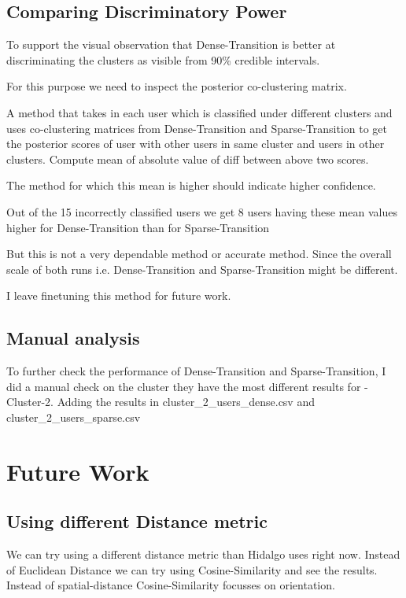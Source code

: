 \documentclass{article}
\begin{document}
\subsection{Comparing Discriminatory Power}
To support the visual observation that Dense-Transition is better at discriminating the clusters as visible from 90\% credible intervals.

For this purpose we need to inspect the posterior co-clustering matrix.

A method that takes in each user which is classified under different clusters and uses co-clustering matrices from Dense-Transition and Sparse-Transition to get the posterior scores of user with other users in same cluster and users in other clusters.
Compute mean of absolute value of diff between above two scores.

The method for which this mean is higher should indicate higher confidence.

Out of the 15 incorrectly classified users we get 8 users having these mean values higher for Dense-Transition than for Sparse-Transition

But this is not a very dependable method or accurate method. Since the overall scale of both runs i.e. Dense-Transition and Sparse-Transition might be different.

I leave finetuning this method for future work.


\subsection{Manual analysis}

To further check the performance of Dense-Transition and Sparse-Transition, I did a manual check on the cluster they have the most different results for - Cluster-2.
Adding the results in cluster\_2\_users\_dense.csv and cluster\_2\_users\_sparse.csv



\section{Future Work}
\subsection{Using different Distance metric}
We can try using a different distance metric than Hidalgo uses right now. Instead of Euclidean Distance we can try using Cosine-Similarity and see the results.
Instead of spatial-distance Cosine-Similarity focusses on orientation.
\end{document}
